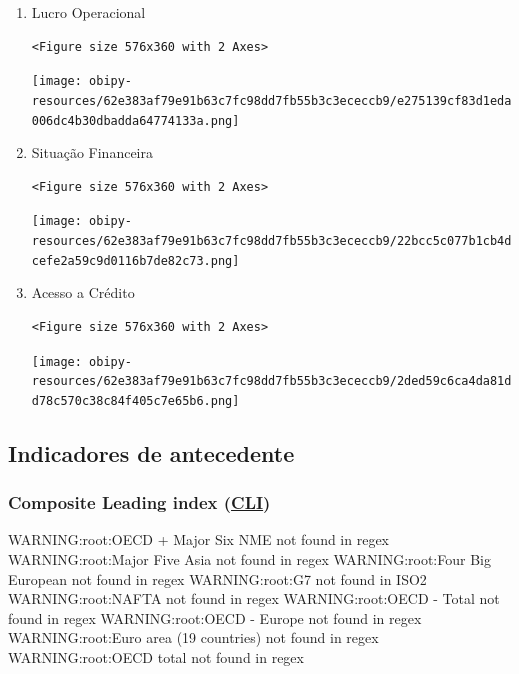 \documentclass[11pt]{article}
\begin{document}
\begin{enumerate}
\item Lucro Operacional
\label{sec:org202765e}


\begin{verbatim}
<Figure size 576x360 with 2 Axes>
\end{verbatim}


\begin{center}
\texttt{[image: obipy-resources/62e383af79e91b63c7fc98dd7fb55b3c3ececcb9/e275139cf83d1eda006dc4b30dbadda64774133a.png]}
\end{center}

\item Situação Financeira
\label{sec:org9acb9cb}

\begin{verbatim}
<Figure size 576x360 with 2 Axes>
\end{verbatim}


\begin{center}
\texttt{[image: obipy-resources/62e383af79e91b63c7fc98dd7fb55b3c3ececcb9/22bcc5c077b1cb4dcefe2a59c9d0116b7de82c73.png]}
\end{center}


\item Acesso a Crédito
\label{sec:org6400384}

\begin{verbatim}
<Figure size 576x360 with 2 Axes>
\end{verbatim}


\begin{center}
\texttt{[image: obipy-resources/62e383af79e91b63c7fc98dd7fb55b3c3ececcb9/2ded59c6ca4da81dd78c570c38c84f405c7e65b6.png]}
\end{center}
\end{enumerate}

\subsection{Indicadores de antecedente}
\label{sec:org48c1bea}

\subsubsection{Composite Leading index (\href{https://stats.oecd.org/Index.aspx?DataSetCode=MEI\_CLI}{CLI})}
\label{sec:orgf6116c8}

WARNING:root:OECD + Major Six NME not found in regex
WARNING:root:Major Five Asia not found in regex
WARNING:root:Four Big European not found in regex
WARNING:root:G7 not found in ISO2
WARNING:root:NAFTA not found in regex
WARNING:root:OECD - Total not found in regex
WARNING:root:OECD - Europe not found in regex
WARNING:root:Euro area (19 countries) not found in regex
WARNING:root:OECD total  not found in regex
\end{document}

